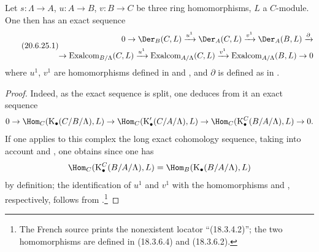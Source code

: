\begin{proposition}[20.6.25]
\label{0.20.6.25}
Let $s:\Lambda\to A$, $u:A\to B$, $v:B\to C$ be three ring homomorphisms, $L$ a $C$-module.
One then has an exact sequence
\begin{equation}
\tag{20.6.25.1}
  \label{0.20.6.25.1}
\begin{split}
  0\to\Der_B(C,L)\xrightarrow{u^1}\Der_A(C,L)\xrightarrow{v^1}\Der_A(B,L)\xrightarrow{\partial} \\
  \to\operatorname{Exalcom}_{B/\Lambda}(C,L)\xrightarrow{u^1}\operatorname{Exalcom}_{A/\Lambda}(C,L)\xrightarrow{v^1}\operatorname{Exalcom}_{A/\Lambda}(B,L)\to 0
\end{split}
\end{equation}
where $u^1$, $v^1$ are homomorphisms defined in  and , and $\partial$ is defined as in .
\end{proposition}

\begin{proof}
Indeed, as the exact sequence  is split, one deduces from it an exact sequence
\[
  0\to\Hom_C(\mathrm{K}_\bullet(C/B/\Lambda),L)\to\Hom_C(\mathrm{K}'_\bullet(C/A/\Lambda),L)\to\Hom_C(\mathrm{K}^C_\bullet(B/A/\Lambda),L)\to 0.
\]
If one applies to this complex the long exact cohomology sequence, taking into account  and , one obtains  since one has
\[
  \Hom_C(\mathrm{K}^C_\bullet(B/A/\Lambda),L)=\Hom_B(\mathrm{K}_\bullet(B/A/\Lambda),L)
\]
by definition; the identification of $u^1$ and $v^1$ with the homomorphisms  and , respectively, follows from .\footnote{The French source prints the nonexistent locator ``(18.3.4.2)''; the two homomorphisms are defined in (18.3.6.4) and (18.3.6.2).}
\end{proof}

